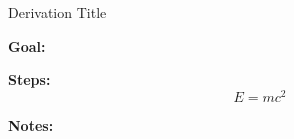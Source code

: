 \begin{mathbox}{Derivation Title}

\textbf{Goal:}

\textbf{Steps:}
\[
E = mc^2
\]

\textbf{Notes:}

\end{mathbox}